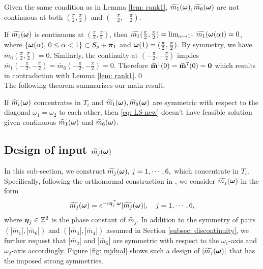 \begin{proposition}\label{prop: continuity}
Given the same condition as in Lemma \ref{lem: rank1}, $\widetilde{m_{1}}(\boldsymbol{\omega}),\widetilde{m_{6}}(\boldsymbol{\omega})$ are not continuous at both $(\frac{\pi}{2},\frac{\pi}{2})$ and $(-\frac{\pi}{2},-\frac{\pi}{2})$.
\end{proposition}
If $\widetilde{m_{1}}(\boldsymbol{\omega})$ is continuous at $(\frac{\pi}{2},\frac{\pi}{2})$, then $\widetilde{m_1}(\frac{\pi}{2},\frac{\pi}{2}) = \lim_{\alpha\rightarrow 1^-}\widetilde{m_1}(\boldsymbol{\omega}(\alpha)) = 0$, where $\{\boldsymbol{\omega}(\alpha),\,0\leq \alpha<1\} \subset S_\rho + \boldsymbol{\pi}_1$ and $\boldsymbol{\omega}(1) = (\frac{\pi}{2},\frac{\pi}{2})$. By symmetry, we have $\widetilde{m_6}(\frac{\pi}{2},\frac{\pi}{2}) = 0$. Similarly, the continuity at $(-\frac{\pi}{2},-\frac{\pi}{2})$ implies $\widetilde{m_1}(-\frac{\pi}{2},-\frac{\pi}{2}) = \widetilde{m_6}(-\frac{\pi}{2},-\frac{\pi}{2}) = 0$. Therefore $\widetilde{\mathbf{m}}^{1}(0) = \widetilde{\mathbf{m}}^{7}(0) = \mathbf{0}$ which results in contradiction with Lemma \ref{lem: rank1}.\qed\\[1em]%
The following theorem summarizes our main result.
\begin{theorem}\label{thm: thm}
If  $\widetilde{m_{i}}(\boldsymbol{\omega})$ concentrates in $T_i$ and $\widetilde{m_{1}}(\boldsymbol{\omega}),\widetilde{m_{6}}(\boldsymbol{\omega})$ are symmetric with respect to the diagonal $\omega_1=\omega_2$ to each other,  then  \eqref{eq: LS-new} doesn't have feasible solution given continuous $\widetilde{m_{1}}(\boldsymbol{\omega})$ and $\widetilde{m_{6}}(\boldsymbol{\omega})$.
\end{theorem}

\subsection{Design of input $\widetilde{m_{j}}(\boldsymbol{\omega})$}\label{sec: phase-design}
In this sub-section, we construct $\widetilde{m_{j}}(\boldsymbol{\omega}),\, j = 1,\cdots,6,$ which concentrate in $T_i$.
Specifically, following the orthonormal construction in \cite{yin2014orthshear}, we consider $\widetilde{m_{j}}(\boldsymbol{\omega})$ in the form 
\begin{align}\label{eq: m-form}
\widetilde{m_{j}}(\boldsymbol{\omega}) = e^{-i\boldsymbol{\eta}_j^\top\boldsymbol{\omega}}|\widetilde{m_{j}}(\boldsymbol{\omega})|,\quad j = 1,\cdots,6,
\end{align}
where $\boldsymbol{\eta}_j\in\mathbb{Z}^2$ is the phase constant of $\widetilde{m_j}$. In addition to the symmetry of pairs $(|\widetilde{m_1}|, |\widetilde{m_6}|)$ and $(|\widetilde{m_3}|, |\widetilde{m_4}|)$ assumed in Section \ref{subsec: discontinuity}, we further request that $|\widetilde{m_2}|$ and $|\widetilde{m_5}|$ are symmetric with respect to the $\omega_1$-axis and $\omega_2$-axis accordingly.
Figure \ref{fig: mjdual} shows such a design of $|\widetilde{m_{j}}(\boldsymbol{\omega})|$ that has the imposed strong symmetries.
 
